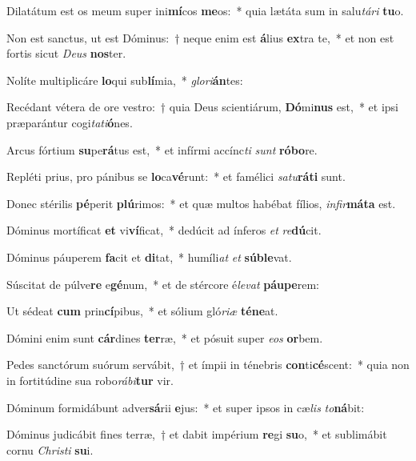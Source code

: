 \item Dilatátum est os meum super ini\textbf{mí}cos \textbf{me}os:~* quia lætáta sum in salu\textit{tá}\textit{ri} \textbf{tu}o.
\item Non est sanctus, ut est Dóminus:~† neque enim est \textbf{á}lius \textbf{ex}tra te,~* et non est fortis sicut \textit{De}\textit{us} \textbf{nos}ter.
\item Nolíte multiplicáre \textbf{lo}qui sub\textbf{lí}mia,~* \textit{glo}\textit{ri}\textbf{án}tes:
\item Recédant vétera de ore vestro:~† quia Deus scientiárum, \textbf{Dó}mi\textbf{nus} est,~* et ipsi præparántur cogi\textit{ta}\textit{ti}\textbf{ó}nes.
\item Arcus fórtium \textbf{su}pe\textbf{rá}tus est,~* et infírmi accínc\textit{ti} \textit{sunt} \textbf{ró}\textbf{bo}re.
\item Repléti prius, pro pánibus se \textbf{lo}ca\textbf{vé}runt:~* et famélici \textit{sa}\textit{tu}\textbf{rá}\textbf{ti} sunt.
\item Donec stérilis \textbf{pé}perit \textbf{plú}rimos:~* et quæ multos habébat fílios, \textit{in}\textit{fir}\textbf{má}\textbf{ta} est.
\item Dóminus mortíficat \textbf{et} vi\textbf{ví}ficat,~* dedúcit ad ínferos \textit{et} \textit{re}\textbf{dú}cit.
\item Dóminus páuperem \textbf{fa}cit et \textbf{di}tat,~* humíli\textit{at} \textit{et} \textbf{súb}\textbf{le}vat.
\item Súscitat de púlve\textbf{re} e\textbf{gé}num,~* et de stércore é\textit{le}\textit{vat} \textbf{páu}\textbf{pe}rem:
\item Ut sédeat \textbf{cum} prin\textbf{cí}pibus,~* et sólium gló\textit{ri}\textit{æ} \textbf{té}\textbf{ne}at.
\item Dómini enim sunt \textbf{cár}dines \textbf{ter}ræ,~* et pósuit super \textit{e}\textit{os} \textbf{or}bem.
\item Pedes sanctórum suórum servábit,~† et ímpii in ténebris \textbf{con}ti\textbf{cé}scent:~* quia non in fortitúdine sua robo\textit{rá}\textit{bi}\textbf{tur} vir.
\item Dóminum formidábunt adver\textbf{sá}rii \textbf{e}jus:~* et super ipsos in cæ\textit{lis} \textit{to}\textbf{ná}bit:
\item Dóminus judicábit fines terræ,~† et dabit impérium \textbf{re}gi \textbf{su}o,~* et sublimábit cornu \textit{Chris}\textit{ti} \textbf{su}i.
